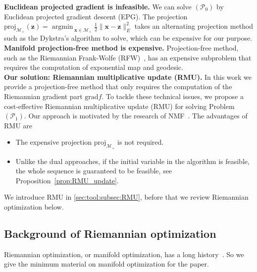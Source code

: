\documentclass[sn-mathphys-num]{sn-jnl}
\DeclareMathOperator*{\argmin}{\textrm{argmin}\,} %
\def\grad            {\textrm{grad}}     %
\def\proj            {\textrm{proj}}     %
\def\x {\bm{x}}
\def\z {\bm{z}}
\def\cM { \mathcal{M}}
\def\cP { \mathcal{P}}
\begin{document}
\noindent\textbf{Euclidean projected gradient is infeasible.}
We can solve $(\cP_0)$ by Euclidean projected gradient descent (EPG).
The projection $\proj_{\cM_+ }(  \z ) = {\displaystyle \argmin_{\x \in \cM_+}} \frac{1}{2}\| \x - \z \|_E^2$ takes an alternating projection method such as the Dykstra's algorithm \cite{boyle1986method} to solve, which can be expensive for our purpose.
\\

\noindent\textbf{Manifold projection-free method is expensive.}
Projection-free method, such as the Riemannian Frank-Wolfe (RFW)~\cite{weber2023riemannian}, has an expensive subproblem that requires the computation of exponential map and geodesic.
\\

\noindent\textbf{Our solution: Riemannian multiplicative update (RMU).}
In this work we provide a projection-free method that only requires the computation of the Riemannian gradient part $\grad f$.
To tackle these technical issues, we propose a cost-effective Riemannian multiplicative update (RMU) for solving Problem $(\cP_1)$.
Our approach is motivated by the research of NMF~\cite[]{gillis2020nonnegative}.
The advantages of RMU are
\begin{itemize}
    \item The expensive projection $\proj_{\cM_+}$ is not required.
    \item Unlike the dual approaches, if the initial variable in the algorithm is feasible, the whole sequence is guaranteed to be feasible, see Proposition~\ref{prop:RMU_update}.
\end{itemize}
We introduce RMU in \textsection\ref{sec:tool:subsec:RMU}, before that we review  Riemannian optimization below.























\subsection{Background of Riemannian optimization}\label{sec:tools:subsec:background}
Riemannian optimization, or manifold optimization, has a long history~\cite{luenberger1972gradient,gabay1982minimizing,edelman1998geometry,absil2008optimization,udriste2013convex,rapcsak2013smooth,bento2017iteration,boumal2023introduction}.
So we give the minimum material on manifold optimization for the paper.
\\
\end{document}
